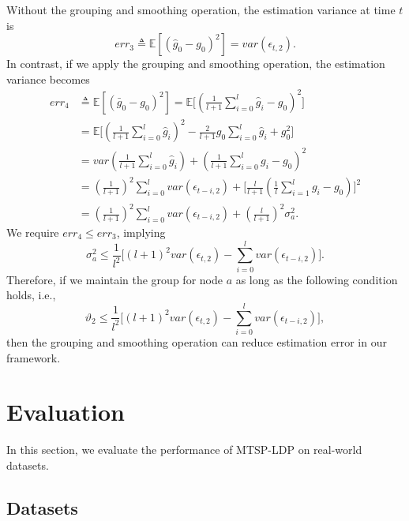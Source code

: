 \documentclass[acmsmall]{acmart}
\newcommand{\E}{\mathbb{E}}
\newcommand{\err}{\mathit{err}}
\newcommand{\var}{\mathit{var}}
\begin{document}
Without the grouping and smoothing operation, the estimation variance at time $t$
is
\[
  \err_3 \triangleq \E[(\hat{g}_0-g_0)^2] = \var(\epsilon_{t,2}).
\]
In contrast, if we apply the grouping and smoothing operation, the estimation
variance becomes
\begin{align*}
  \err_4
  &\triangleq \E[(\bar{g}_0-g_0)^2]
    = \E\big[(\frac{1}{l+1}\sum_{i=0}^l\hat{g}_i - g_0)^2\big] \\
  &= \E\big[(\frac{1}{l+1}\sum_{i=0}^l\hat{g}_i)^2
    -\frac{2}{l+1}g_0\sum_{i=0}^l\hat{g}_i  + g_0^2\big] \\
  &= \var(\frac{1}{l+1}\sum_{i=0}^l\hat{g}_i)
    + (\frac{1}{l+1}\sum_{i=0}^lg_i - g_0)^2 \\
  &= (\frac{1}{l+1})^2\sum_{i=0}^l\var(\epsilon_{t-i,2})
    + \big[\frac{l}{l+1}(\frac{1}{l}\sum_{i=1}^lg_i - g_0)\big]^2 \\
  &= (\frac{1}{l+1})^2\sum_{i=0}^l\var(\epsilon_{t-i,2})
    + (\frac{l}{l+1})^2\sigma_a^2.
\end{align*}
We require $\err_4\le\err_3$, implying
\[
  \sigma_a^2\leq\frac{1}{l^2}\big[ (l+1)^2\var(\epsilon_{t,2})
  -\sum_{i=0}^l\var(\epsilon_{t-i,2})\big].
\]
Therefore, if we maintain the group for node $a$ as long as the following condition holds, i.e.,
\begin{equation}\label{eq:theta2}
  \vartheta_2
  \leq\frac{1}{l^2}\big[ (l+1)^2\var(\epsilon_{t,2})
  -\sum_{i=0}^l\var(\epsilon_{t-i,2})\big],
\end{equation}
then the grouping and smoothing operation can reduce estimation error in our
framework.








\section{Evaluation} \label{sec:Evaluation}

In this section, we evaluate the performance of MTSP-LDP on real-world datasets.




\subsection{Datasets}
\end{document}
